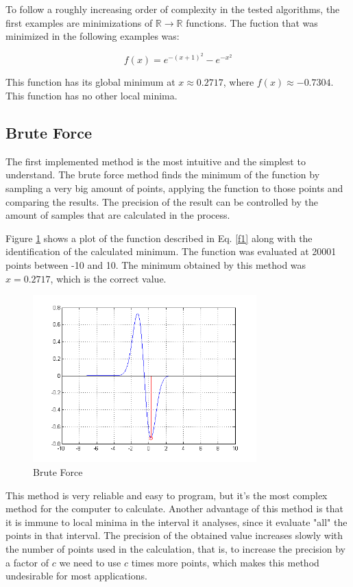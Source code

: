 \documentclass[journal]{IEEEtran}
\begin{document}
To follow a roughly increasing order of complexity in the tested algorithms, the first examples are minimizations of $\mathbb{R}\rightarrow\mathbb{R}$ functions. The fuction that was minimized in the following examples was:

\begin{equation}
f(x) = e^{-(x+1)^2}-e^{-x^2}
\label{f1}
\end{equation}

This function has its global minimum at $x\approx 0.2717$, where $f(x)\approx -0.7304$. This function has no other local minima.

\subsection{Brute Force}

The first implemented method is the most intuitive and the simplest to understand. The brute force method finds the minimum of the function by sampling a very big amount of points, applying the function to those points and comparing the results. The precision of the result can be controlled by the amount of samples that are calculated in the process.

Figure \ref{figBF} shows a plot of the function described in Eq. \ref{f1} along with the identification of the calculated minimum. The function was evaluated at 20001 points between -10 and 10. The minimum obtained by this method was $x = 0.2717$, which is the correct value.

\begin{figure}[H]
\centering
\includegraphics[width=3.4in]{figures/1d-bruteForce.png}
\caption{Brute Force}
\label{figBF}
\end{figure}

This method is very reliable and easy to program, but it's the most complex method for the computer to calculate. Another advantage of this method is that it is immune to local minima in the interval it analyses, since it evaluate "all" the points in that interval. The precision of the obtained value increases slowly with the number of points used in the calculation, that is, to increase the precision by a factor of $c$ we need to use $c$ times more points, which makes this method undesirable for most applications.
\end{document}
